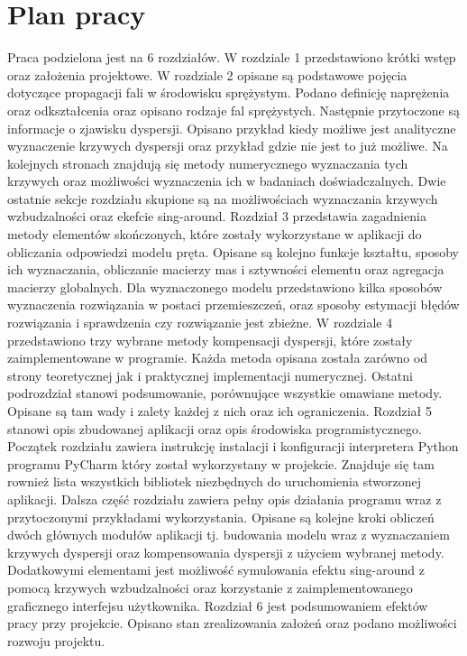 \section{Plan pracy}
\label{sec:plan_pracy}

Praca podzielona jest na 6 rozdziałów. W rozdziale 1 przedstawiono krótki wstęp oraz założenia projektowe. W rozdziale 2 opisane są podstawowe pojęcia dotyczące propagacji fali w środowisku sprężystym. Podano definicję naprężenia oraz odkształcenia oraz opisano rodzaje fal sprężystych. Następnie przytoczone są informacje o zjawisku dyspersji. Opisano przykład kiedy możliwe jest analityczne wyznaczenie krzywych dyspersji oraz przykład gdzie nie jest to już możliwe. Na kolejnych stronach znajdują się metody numerycznego wyznaczania tych krzywych oraz możliwości wyznaczenia ich w badaniach doświadczalnych. Dwie ostatnie sekcje rozdziału skupione są na możliwościach wyznaczania krzywych wzbudzalności oraz ekefcie sing-around. Rozdział 3 przedstawia zagadnienia metody elementów skończonych, które zostały wykorzystane w aplikacji do obliczania odpowiedzi modelu pręta. Opisane są kolejno funkcje kształtu, sposoby ich wyznaczania, obliczanie macierzy mas i sztywności elementu oraz agregacja macierzy globalnych. Dla wyznaczonego modelu przedstawiono kilka sposobów wyznaczenia rozwiązania w postaci przemieszczeń, oraz sposoby estymacji błędów rozwiązania i sprawdzenia czy rozwiązanie jest zbieżne. W rozdziale 4 przedstawiono trzy wybrane metody kompensacji dyspersji, które zostały zaimplementowane w programie. Każda metoda opisana została zarówno od strony teoretycznej jak i praktycznej implementacji numerycznej. Ostatni podrozdział stanowi podsumowanie, porównujące wszystkie omawiane metody. Opisane są tam wady i zalety każdej z nich oraz ich ograniczenia. Rozdział 5 stanowi opis zbudowanej aplikacji oraz opis środowiska programistycznego. Początek rozdziału zawiera instrukcję instalacji i konfiguracji interpretera Python programu PyCharm  który został wykorzystany w projekcie. Znajduje się tam rownież lista wszystkich bibliotek niezbędnych do uruchomienia stworzonej aplikacji. Dalsza część rozdziału zawiera pełny opis działania programu wraz z przytoczonymi przykładami wykorzystania. Opisane są kolejne kroki obliczeń dwóch głównych modułów aplikacji tj. budowania modelu wraz z wyznaczaniem krzywych dyspersji oraz kompensowania dyspersji z użyciem wybranej metody. Dodatkowymi elementami jest możliwość symulowania efektu sing-around z pomocą krzywych wzbudzalności oraz korzystanie z zaimplementowanego graficznego interfejsu użytkownika. Rozdział 6 jest podsumowaniem efektów pracy przy projekcie. Opisano stan zrealizowania założeń oraz podano możliwości rozwoju projektu.





















